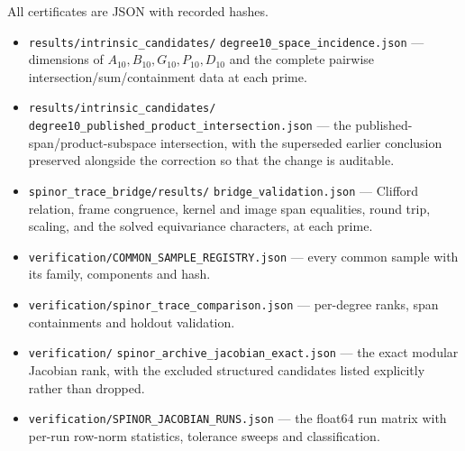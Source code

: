 All certificates are JSON with recorded hashes.

\begin{itemize}
\item \texttt{results/intrinsic\_candidates/}\allowbreak
      \texttt{degree10\_space\_incidence.json} ---
      dimensions of $A_{10},B_{10},G_{10},P_{10},D_{10}$ and the complete
      pairwise intersection/sum/containment data at each prime.
\item \texttt{results/intrinsic\_candidates/}\allowbreak
      \texttt{degree10\_published\_product\_intersection.json}
      --- the published-span/product-subspace intersection, with the superseded
      earlier conclusion preserved alongside the correction so that the change is
      auditable.
\item \texttt{spinor\_trace\_bridge/results/}\allowbreak
      \texttt{bridge\_validation.json} --- Clifford
      relation, frame congruence, kernel and image span equalities, round trip,
      scaling, and the solved equivariance characters, at each prime.
\item \texttt{verification/COMMON\_SAMPLE\_REGISTRY.json} --- every common sample
      with its family, components and hash.
\item \texttt{verification/spinor\_trace\_comparison.json} --- per-degree ranks,
      span containments and holdout validation.
\item \texttt{verification/}\allowbreak
      \texttt{spinor\_archive\_jacobian\_exact.json} --- the exact
      modular Jacobian rank, with the excluded structured candidates listed
      explicitly rather than dropped.
\item \texttt{verification/SPINOR\_JACOBIAN\_RUNS.json} --- the float64 run
      matrix with per-run row-norm statistics, tolerance sweeps and
      classification.
\end{itemize}
